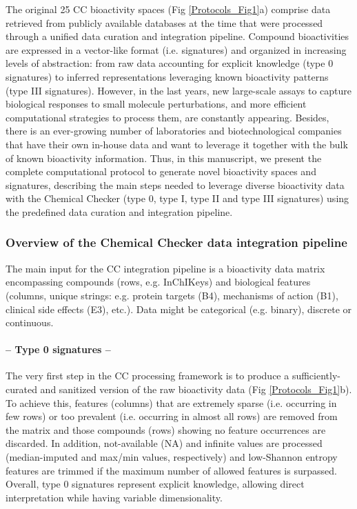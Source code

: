 The original 25 CC bioactivity spaces (Fig \ref{Protocols_Fig1}a) comprise data retrieved from publicly available databases at the time that were processed through a unified data curation and integration pipeline. Compound bioactivities are expressed in a vector-like format (i.e. signatures) and organized in increasing levels of abstraction: from raw data accounting for explicit knowledge (type 0 signatures) to inferred representations leveraging known bioactivity patterns (type III signatures). However, in the last years, new large-scale assays to capture biological responses to small molecule perturbations, and more efficient computational strategies to process them, are constantly appearing\cite{anglada-girotto_combining_2022, mitchell_proteome-wide_2023, offensperger_large-scale_2024}. Besides, there is an ever-growing number of laboratories and biotechnological companies that have their own in-house data and want to leverage it together with the bulk of known bioactivity information. Thus, in this manuscript, we present the complete computational protocol to generate novel bioactivity spaces and signatures, describing the main steps needed to leverage diverse bioactivity data with the Chemical Checker (type 0, type I, type II and type III signatures) using the predefined data curation and integration pipeline.

\subsubsection{Overview of the Chemical Checker data integration pipeline}

The main input for the CC integration pipeline is a bioactivity data matrix encompassing compounds (rows, e.g. InChIKeys) and biological features (columns, unique strings: e.g. protein targets (B4), mechanisms of action (B1), clinical side effects (E3), etc.). Data might be categorical (e.g. binary), discrete or continuous.

\paragraph{-- Type 0 signatures --} \leavevmode

The very first step in the CC processing framework is to produce a sufficiently-curated and sanitized version of the raw bioactivity data (Fig \ref{Protocols_Fig1}b). To achieve this, features (columns) that are extremely sparse (i.e. occurring in few rows) or too prevalent (i.e. occurring in almost all rows) are removed from the matrix and those compounds (rows) showing no feature occurrences are discarded. In addition, not-available (NA) and infinite values are processed (median-imputed and max/min values, respectively) and low-Shannon entropy features are trimmed if the maximum number of allowed features is surpassed. Overall, type 0 signatures represent explicit knowledge, allowing direct interpretation while having variable dimensionality. 

